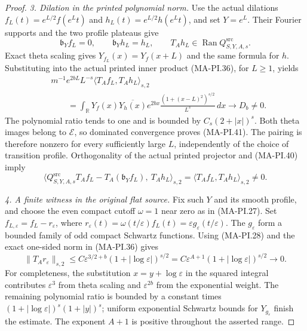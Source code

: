 \begin{proof}
\emph{3. Dilation in the printed polynomial norm.}
Use the actual dilations $f_L(t)=e^{L/2}f(e^Lt)$ and
$h_L(t)=e^{L/2}h(e^Lt)$, and set $Y=e^L$.
Their Fourier supports and the two profile plateaus give
\[
 \mathfrak b_Y f_L=0,\qquad
 \mathfrak b_Y h_L=h_L,\qquad
 T_Ah_L\in\operatorname{Ran}Q^{\mathrm{src}}_{S,Y,A,s}.
 \tag{MA-PI.40}
\]
Exact theta scaling gives $Y_{f_L}(x)=Y_f(x+L)$ and the
same formula for $h$.  Substituting into the actual
printed inner product (MA-PI.36), for $L\geq1$, yields
\[
 \begin{split}
 &m^{-1}e^{2bL}L^{-s}
        \langle T_A f_L,T_A h_L\rangle_{s,2}\\
 &\qquad=\int_{\mathbb R}Y_f(x)\overline{Y_h(x)}e^{2bx}
                  \frac{(1+(x-L)^2)^{s/2}}{L^s}\,dx
                         \longrightarrow D_b\ne0.
 \end{split}
 \tag{MA-PI.41}
\]
The polynomial ratio tends to one and is bounded by
$C_s(2+|x|)^s$.  Both theta images belong to $\mathcal E$,
so dominated convergence proves (MA-PI.41).  The pairing
is therefore nonzero for every sufficiently large $L$,
independently of the choice of transition profile.
Orthogonality of the actual printed projector and
(MA-PI.40) imply
\[
 \bigl\langle
 Q^{\mathrm{src}}_{S,Y,A,s}T_Af_L
       -T_A(\mathfrak b_Y f_L),\ T_Ah_L\bigr\rangle_{s,2}
        =\langle T_Af_L,T_Ah_L\rangle_{s,2}\ne0.
 \tag{MA-PI.42}
\]

\emph{4. A finite witness in the original flat source.}
Fix such $Y$ and its smooth profile, and choose the even
compact cutoff $\omega=1$ near zero as in (MA-PI.27).
Set $f_{L,\varepsilon}=f_L-r_\varepsilon$, where
$r_\varepsilon(t)=\omega(t/\varepsilon)f_L(t)
                  =\varepsilon g_\varepsilon(t/\varepsilon)$.
The $g_\varepsilon$ form a bounded family of odd compact
Schwartz functions.  Using (MA-PI.28) and the exact
one-sided norm in (MA-PI.36) gives
\[
 \|T_A r_\varepsilon\|_{s,2}
      \leq C\varepsilon^{3/2+b}
                    (1+|\log\varepsilon|)^{s/2}
       =C\varepsilon^{A+1}(1+|\log\varepsilon|)^{s/2}
                          \longrightarrow0.
 \tag{MA-PI.43}
\]
For completeness, the substitution $x=y+\log\varepsilon$
in the squared integral contributes $\varepsilon^3$
from theta scaling and $\varepsilon^{2b}$ from the
exponential weight.  The remaining polynomial ratio is
bounded by a constant times
$(1+|\log\varepsilon|)^s(1+|y|)^s$; uniform exponential
Schwartz bounds for $Y_{g_\varepsilon}$ finish the estimate.
The exponent $A+1$ is positive throughout the asserted range.


\end{proof}
